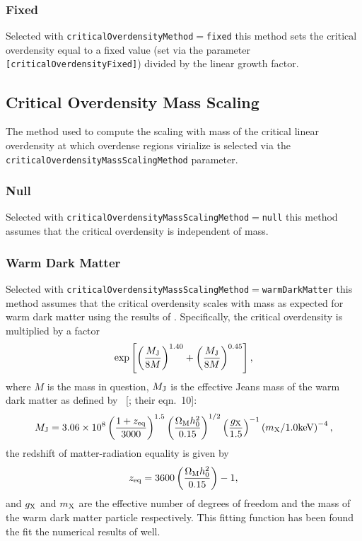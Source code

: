 \subsubsection{Fixed}

Selected with {\tt criticalOverdensityMethod}$=${\tt fixed} this method sets the critical overdensity equal to a fixed value (set via the parameter {\tt [criticalOverdensityFixed]}) divided by the linear growth factor.

\subsection{Critical Overdensity Mass Scaling}

The method used to compute the scaling with mass of the critical linear overdensity at which overdense regions virialize is selected via the {\tt criticalOverdensityMassScalingMethod} parameter.

\subsubsection{Null}

Selected with {\tt criticalOverdensityMassScalingMethod}$=${\tt null} this method assumes that the critical overdensity is independent of mass.

\subsubsection{Warm Dark Matter}

Selected with {\tt criticalOverdensityMassScalingMethod}$=${\tt warmDarkMatter} this method assumes that the critical overdensity scales with mass as expected for warm dark matter using the results of \cite{barkana_constraints_2001}. Specifically, the critical overdensity is multiplied by a factor
\begin{equation}
 \exp\left[ \left({M_{\rm J} \over 8 M}\right)^{1.40}+\left({M_{\rm J} \over 8 M}\right)^{0.45} \right],
\end{equation}
where $M$ is the mass in question, $M_{\rm J}$ is the effective Jeans mass of the warm dark matter as defined by \citeauthor{barkana_constraints_2001}~[\citeyear{barkana_constraints_2001}; their eqn.~10]:
\begin{equation}
M_{\rm J} =  3.06 \times 10^8 \left( {1+z_{\rm eq} \over 3000}\right)^{1.5} \left({\Omega_{\rm M} h_0^2 \over 0.15}\right)^{1/2} \left({g_{\rm X} \over 1.5} \right)^{-1} \left({m_{\rm X}/1.0\hbox{keV}}\right)^{-4},
\end{equation}
the redshift of matter-radiation equality is given by
\begin{equation}
z_{\rm eq} = 3600 \left({\Omega_{\rm M} h_0^2 \over 0.15}\right)-1,
\end{equation}
and $g_{\rm X}$ and $m_{\rm X}$ are the effective number of degrees of freedom and the mass of the warm dark matter particle respectively. This fitting function has been found the fit the numerical results of \cite{barkana_constraints_2001} well.


